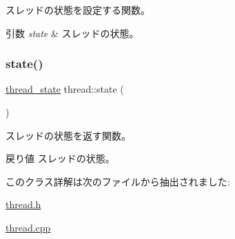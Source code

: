スレッドの状態を設定する関数。 
\begin{DoxyParams}{引数}
{\em state} & スレッドの状態。 \\
\hline
\end{DoxyParams}
\hypertarget{classthread_a3bbc0f9939912ffb6d31439e36d09e94}{}\label{classthread_a3bbc0f9939912ffb6d31439e36d09e94} 
\subsubsection{\texorpdfstring{state()}{state()}\hspace{0.1cm}{\footnotesize\ttfamily [2/2]}}
{\footnotesize\ttfamily \hyperlink{thread_8h_a4b1b32c1fc744438f665f0f1932dd207}{thread\+\_\+state} thread\+::state (\begin{DoxyParamCaption}{ }\end{DoxyParamCaption})}

スレッドの状態を返す関数。 \begin{DoxyReturn}{戻り値}
スレッドの状態。 
\end{DoxyReturn}


このクラス詳解は次のファイルから抽出されました\+:\begin{DoxyCompactItemize}
\item 
\hyperlink{thread_8h}{thread.\+h}\item 
\hyperlink{thread_8cpp}{thread.\+cpp}\end{DoxyCompactItemize}
